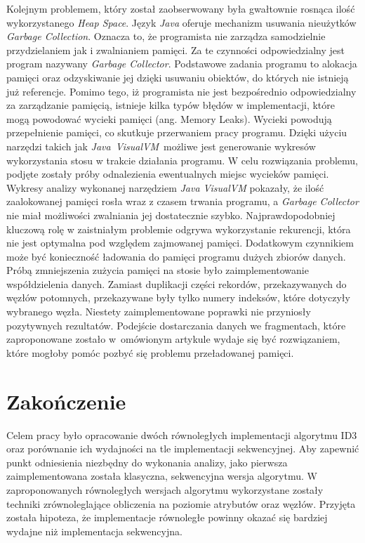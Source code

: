 \documentclass[12pt]{article}
\begin{document}
Kolejnym problemem, który został zaobserwowany była gwałtownie rosnąca ilość wykorzystanego \textit{Heap Space}.
Język \textit{Java} oferuje mechanizm usuwania nieużytków \textit{Garbage Collection}. Oznacza to, że programista nie zarządza
samodzielnie przydzielaniem jak i zwalnianiem pamięci. Za te czynności odpowiedzialny jest program nazywany \textit{Garbage Collector}.
Podstawowe zadania programu to alokacja pamięci oraz odzyskiwanie jej dzięki usuwaniu obiektów, do których nie istnieją już referencje.
Pomimo tego, iż programista nie jest bezpośrednio odpowiedzialny za zarządzanie pamięcią, istnieje kilka typów błędów w
implementacji, które mogą powodować wycieki pamięci (ang. Memory Leaks). Wycieki powodują przepełnienie pamięci,
co skutkuje przerwaniem pracy programu.
Dzięki użyciu narzędzi takich jak \textit{Java~VisualVM}~możliwe jest generowanie wykresów wykorzystania stosu
w trakcie działania programu.
W celu rozwiązania problemu, podjęte zostały próby odnalezienia ewentualnych miejsc wycieków pamięci.
Wykresy analizy wykonanej narzędziem \textit{Java VisualVM} pokazały, że ilość zaalokowanej pamięci rosła wraz
z czasem trwania programu, a \textit{Garbage Collector} nie miał możliwości zwalniania jej dostatecznie szybko. 
Najprawdopodobniej kluczową rolę w zaistniałym problemie odgrywa wykorzystanie rekurencji, która nie jest optymalna pod względem
zajmowanej pamięci. Dodatkowym czynnikiem może być konieczność ładowania do pamięci programu dużych zbiorów danych.
Próbą zmniejszenia zużycia pamięci na stosie było zaimplementowanie współdzielenia danych. Zamiast duplikacji części rekordów,
przekazywanych do węzłów potomnych, przekazywane były tylko numery indeksów, które dotyczyły wybranego węzła.
Niestety zaimplementowane poprawki nie przyniosły pozytywnych rezultatów.
Podejście dostarczania danych we fragmentach, które zaproponowane zostało w~omówionym artykule \cite{parallel-algorithm-to-induce-decision-trees}
wydaje się być rozwiązaniem, które mogłoby pomóc pozbyć się problemu przeładowanej pamięci.

\newpage

\cleardoublepage
{}
{}
\section*{Zakończenie}

Celem pracy było opracowanie dwóch równoległych implementacji algorytmu ID3 oraz
porównanie ich wydajności na tle implementacji sekwencyjnej. Aby zapewnić punkt odniesienia niezbędny do
wykonania analizy, jako pierwsza zaimplementowana została klasyczna, sekwencyjna wersja algorytmu.
W zaproponowanych równoległych wersjach algorytmu wykorzystane zostały techniki zrównoleglające
obliczenia na poziomie atrybutów oraz węzłów. 
Przyjęta została hipoteza, że implementacje równoległe powinny okazać się bardziej wydajne
niż implementacja sekwencyjna.
\end{document}
